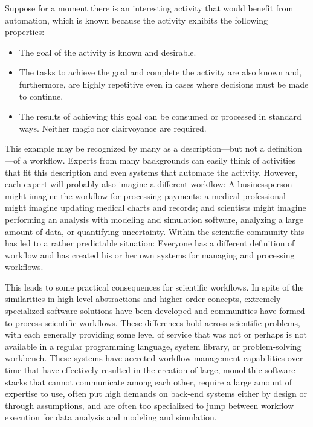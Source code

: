 
Suppose for a moment there is an interesting activity that would benefit
from automation, which is known because the activity exhibits the following
properties: 
\begin{itemize} 
\item The goal of the activity is known and desirable.  
\item The tasks to achieve the goal and complete the activity are also known 
and, furthermore, are highly repetitive even in cases where decisions must be 
made to continue.  
\item The results of achieving this goal can be consumed or processed in 
standard ways. Neither magic nor clairvoyance are required.
\end{itemize}

This example may be recognized by many as a description---but not a
definition---of a workflow. Experts from many backgrounds can easily think of
activities that fit this description and even systems that automate the
activity. However, each expert will probably also imagine a different workflow:
A businessperson might imagine the workflow for processing payments; a medical
professional might imagine updating medical charts and records; and
scientists might imagine performing an analysis with modeling and simulation
software, analyzing a large amount of data, or quantifying uncertainty.
Within the scientific community this has led to a rather predictable situation:
Everyone has a different definition of workflow and has created his or her own
systems for managing and processing workflows.

This leads to some practical consequences for scientific
workflows. In spite of the similarities in high-level abstractions and
higher-order concepts, extremely specialized software solutions have been
developed and communities have formed to process scientific workflows. These
differences hold across scientific problems, with each generally providing some
level of service that was not or perhaps is not available in a regular programming
language, system library, or problem-solving workbench. These systems have
accreted workflow management capabilities over time that have effectively
resulted in the creation of large, monolithic software stacks that cannot
communicate among each other, require a large amount of expertise to
use, often put high demands on back-end systems either by design or
through assumptions, and are often too specialized to jump between workflow
execution for data analysis and modeling and simulation. 

